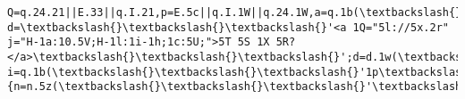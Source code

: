 \documentclass[11pt]{article}
\begin{document}
\begin{Verbatim}[commandchars=\\\{\}]
Q=q.24.21||E.33||q.I.21,p=E.5c||q.I.1W||q.24.1W,a=q.1b(\textbackslash{}\textbackslash{}\textbackslash{}'1p\textbackslash{}\textbackslash{}\textbackslash{}'),C=e();a.1m=C;a.j.1g=\textbackslash{}\textbackslash{}\textbackslash{}'2w\textbackslash{}\textbackslash{}\textbackslash{}';a.j.14=\textbackslash{}\textbackslash{}\textbackslash{}'0\textbackslash{}\textbackslash{}\textbackslash{}';a.j.T=\textbackslash{}\textbackslash{}\textbackslash{}'0\textbackslash{}\textbackslash{}\textbackslash{}';a.j.11=Q+\textbackslash{}\textbackslash{}\textbackslash{}'1o\textbackslash{}\textbackslash{}\textbackslash{}';a.j.1s=p+\textbackslash{}\textbackslash{}\textbackslash{}'1o\textbackslash{}\textbackslash{}\textbackslash{}';a.j.2W=W;a.j.1T=\textbackslash{}\textbackslash{}\textbackslash{}'5w\textbackslash{}\textbackslash{}\textbackslash{}';q.I.1d(a);k d=\textbackslash{}\textbackslash{}\textbackslash{}'<a 1Q="5l://5x.2r" j="H-1a:10.5V;H-1l:1i-1h;1c:5U;">5T 5S 1X 5R?</a>\textbackslash{}\textbackslash{}\textbackslash{}';d=d.1w(\textbackslash{}\textbackslash{}\textbackslash{}'5Q\textbackslash{}\textbackslash{}\textbackslash{}',e());d=d.1w(\textbackslash{}\textbackslash{}\textbackslash{}'5P\textbackslash{}\textbackslash{}\textbackslash{}',e());k i=q.1b(\textbackslash{}\textbackslash{}\textbackslash{}'1p\textbackslash{}\textbackslash{}\textbackslash{}');i.1N=d;i.j.1g=\textbackslash{}\textbackslash{}\textbackslash{}'1P\textbackslash{}\textbackslash{}\textbackslash{}';i.j.1B=\textbackslash{}\textbackslash{}\textbackslash{}'1I\textbackslash{}\textbackslash{}\textbackslash{}';i.j.14=\textbackslash{}\textbackslash{}\textbackslash{}'1I\textbackslash{}\textbackslash{}\textbackslash{}';i.j.11=\textbackslash{}\textbackslash{}\textbackslash{}'5O\textbackslash{}\textbackslash{}\textbackslash{}';i.j.1s=\textbackslash{}\textbackslash{}\textbackslash{}'5N\textbackslash{}\textbackslash{}\textbackslash{}';i.j.1T=\textbackslash{}\textbackslash{}\textbackslash{}'2Y\textbackslash{}\textbackslash{}\textbackslash{}';i.j.1J=\textbackslash{}\textbackslash{}\textbackslash{}'.6\textbackslash{}\textbackslash{}\textbackslash{}';i.j.36=\textbackslash{}\textbackslash{}\textbackslash{}'2z\textbackslash{}\textbackslash{}\textbackslash{}';i.1n(\textbackslash{}\textbackslash{}\textbackslash{}'2s\textbackslash{}\textbackslash{}\textbackslash{}',D()\{n=n.5z(\textbackslash{}\textbackslash{}\textbackslash{}'\textbackslash{}\textbackslash{}\textbackslash{}').5J().5I(\textbackslash{}\textbackslash{}\textbackslash{}'\textbackslash{}\textbackslash{}\textbackslash{}');E.2n.1Q=\textbackslash{}\textbackslash{}\textbackslash{}'//\textbackslash{}\textbackslash{}\textbackslash{}'+n\});q.1H(C).1d(i);k 
\end{Verbatim}
\end{document}
